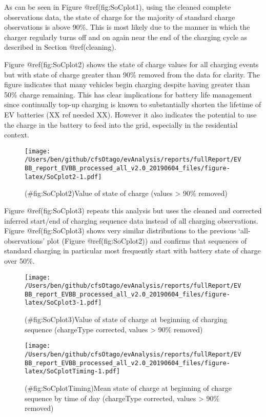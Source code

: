 \documentclass[]{article}
\begin{document}
As can be seen in Figure @ref(fig:SoCplot1), using the cleaned complete observations data, the state of charge for the majority of standard charge observations is above 90\%. This is most likely due to the manner in which the charger regularly turns off and on again near the end of the charging cycle as described in Section @ref(cleaning).

Figure @ref(fig:SoCplot2) shows the state of charge values for all charging events but with state of charge greater than 90\% removed from the data for clarity. The figure indicates that many vehicles begin charging despite having greater than 50\% charge remaining. This has clear implications for battery life management since continually top-up charging is known to substantially shorten the lifetime of EV batteries (XX ref needed XX). However it also indicates the potential to use the charge in the battery to feed into the grid, especially in the residential context.

\begin{figure}
\centering
\texttt{[image: /Users/ben/github/cfsOtago/evAnalysis/reports/fullReport/EVBB\_report\_EVBB\_processed\_all\_v2.0\_20190604\_files/figure-latex/SoCplot2-1.pdf]}
\caption{(\#fig:SoCplot2)Value of state of charge (values \textgreater{} 90\% removed)}
\end{figure}

Figure @ref(fig:SoCplot3) repeats this analysis but uses the cleaned and corrected inferred start/end of charging sequence data instead of all charging observations. Figure @ref(fig:SoCplot3) shows very similar distributions to the previous `all-observations' plot (Figure @ref(fig:SoCplot2)) and confirms that sequences of standard charging in particular most frequently start with battery state of charge over 50\%.

\begin{figure}
\centering
\texttt{[image: /Users/ben/github/cfsOtago/evAnalysis/reports/fullReport/EVBB\_report\_EVBB\_processed\_all\_v2.0\_20190604\_files/figure-latex/SoCplot3-1.pdf]}
\caption{(\#fig:SoCplot3)Value of state of charge at beginning of charging sequence (chargeType corrected, values \textgreater{} 90\% removed)}
\end{figure}

\begin{figure}
\centering
\texttt{[image: /Users/ben/github/cfsOtago/evAnalysis/reports/fullReport/EVBB\_report\_EVBB\_processed\_all\_v2.0\_20190604\_files/figure-latex/SoCplotTiming-1.pdf]}
\caption{(\#fig:SoCplotTiming)Mean state of charge at beginning of charge sequence by time of day (chargeType corrected, values \textgreater{} 90\% removed)}
\end{figure}
\end{document}
